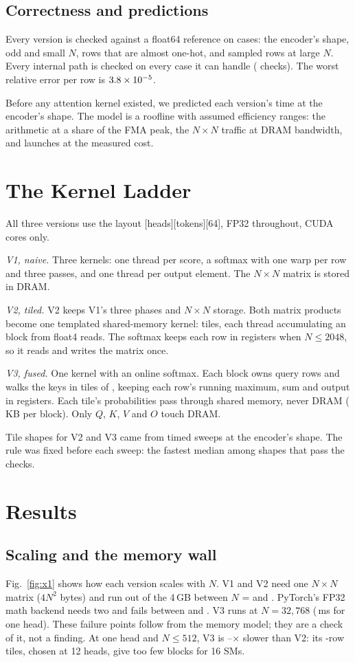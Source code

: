 \documentclass[conference]{IEEEtran}
\newcommand{\NxN}{$N\times N$}
\begin{document}
\subsection{Correctness and predictions}
Every version is checked against a float64 reference on \TestCases{} cases: the encoder's shape, odd and small
$N$, rows that are almost one-hot, and sampled rows at large $N$. Every internal path is checked on every case it
can handle (\TestChecks{} checks). The worst relative error per row is
$3.8\times10^{-5}$.

Before any attention kernel existed, we predicted each version's time at the encoder's shape. The model is a
roofline with assumed efficiency ranges: the arithmetic at a share of the FMA peak, the \NxN{} traffic at DRAM
bandwidth, and launches at the measured cost.

\section{The Kernel Ladder}
All three versions use the layout [heads][tokens][64], FP32 throughout, CUDA cores only.

\textit{V1, naive.} Three kernels: one thread per score, a softmax with one warp per row and three passes, and
one thread per output element. The \NxN{} matrix is stored in DRAM.

\textit{V2, tiled.} V2 keeps V1's three phases and \NxN{} storage. Both matrix products become one templated
shared-memory kernel: \VtwoTile{} tiles, each thread accumulating an \VtwoThreadTile{} block from float4 reads.
The softmax keeps each row in registers when $N \le 2048$, so it reads and writes the matrix once.

\textit{V3, fused.} One kernel with an online softmax. Each block owns \VthreeRows{} query rows and walks the keys
in tiles of \VthreeKeys, keeping each row's running maximum, sum and output in registers. Each tile's
probabilities pass through shared memory, never DRAM (\VthreeSmemKB\,KB per block). Only $Q$, $K$, $V$ and $O$
touch DRAM.

Tile shapes for V2 and V3 came from timed sweeps at the encoder's shape. The rule was fixed before each sweep:
the fastest median among shapes that pass the checks.

\section{Results}
\subsection{Scaling and the memory wall}
Fig.~\ref{fig:x1} shows how each version scales with $N$. V1 and V2 need one \NxN{} matrix ($4N^2$ bytes) and
run out of the 4\,GB between $N$ = \VoneOomLo{} and \VoneOomHi. PyTorch's FP32 math backend needs two and fails
between \BmathOomLo{} and \BmathOomHi. V3 runs at $N = 32{,}768$ (\VthreeBigNMs\,ms for one head). These failure
points follow from the memory model; they are a check of it, not a finding. At one head and $N \le 512$, V3 is
\VthreeSmallLo--\VthreeSmallHi$\times$ slower than V2: its \VthreeRows-row tiles, chosen at 12 heads, give too few
blocks for 16 SMs.
\end{document}
